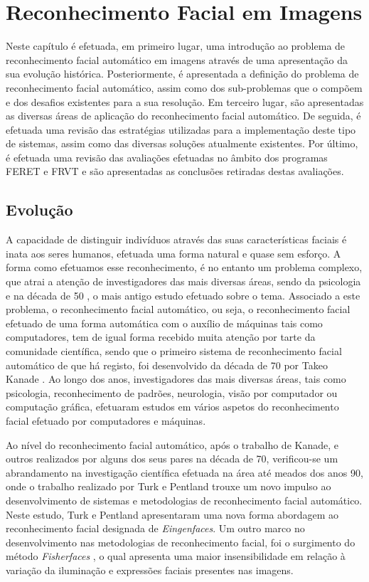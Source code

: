 \chapter{Reconhecimento Facial em Imagens} \label{chap:reco}

Neste capítulo é efetuada, em primeiro lugar, uma introdução ao problema de reconhecimento facial automático em imagens através de uma apresentação da sua evolução histórica. Posteriormente, é apresentada a definição do problema de reconhecimento facial automático, assim como dos sub-problemas que o compõem e dos desafios existentes para a sua resolução. Em terceiro lugar, são apresentadas as diversas áreas de aplicação do reconhecimento facial automático. De seguida, é efetuada uma revisão das estratégias utilizadas para a implementação deste tipo de sistemas, assim como das diversas soluções atualmente existentes. Por último, é efetuada uma revisão das avaliações efetuadas no âmbito dos programas FERET e FRVT e são apresentadas as conclusões retiradas destas avaliações.

\section{Evolução}
A capacidade de distinguir indivíduos através das suas características faciais é inata aos seres humanos, efetuada uma forma natural e quase sem esforço. A forma como efetuamos esse reconhecimento, é no entanto um problema complexo, que atrai a atenção de investigadores das mais diversas áreas, sendo da psicologia e na década de 50 \citep{BRUNERJEROMES.TAGIURI1954}, o mais antigo estudo efetuado sobre o tema. Associado a este problema, o reconhecimento facial automático, ou seja, o reconhecimento facial efetuado de uma forma automática com o auxílio de máquinas tais como computadores, tem de igual forma recebido muita atenção por tarte da comunidade científica, sendo que o primeiro sistema de reconhecimento facial automático de que há registo, foi desenvolvido da década de 70 por Takeo Kanade \citep{Kanade1973}. Ao longo dos anos, investigadores das mais diversas áreas, tais como  psicologia, reconhecimento de padrões, neurologia, visão por computador ou computação gráfica, efetuaram estudos em vários aspetos do reconhecimento facial efetuado por computadores e máquinas.

Ao nível do reconhecimento facial automático, após o trabalho de Kanade, e outros realizados por alguns dos seus pares na década de 70, verificou-se um abrandamento na investigação científica efetuada na área até meados dos anos 90, onde o trabalho realizado por Turk e Pentland \citep{Turk1991} trouxe um novo impulso ao desenvolvimento de sistemas e metodologias de reconhecimento facial automático. Neste estudo, Turk e Pentland apresentaram uma nova forma abordagem ao reconhecimento facial designada de \textit{Eingenfaces}. Um outro marco no desenvolvimento nas metodologias de reconhecimento facial, foi o surgimento do método \textit{Fisherfaces} \citep{Belhumeur1997, Zhao1998}, o qual apresenta uma maior insensibilidade em relação à variação da iluminação e expressões faciais presentes nas imagens.


